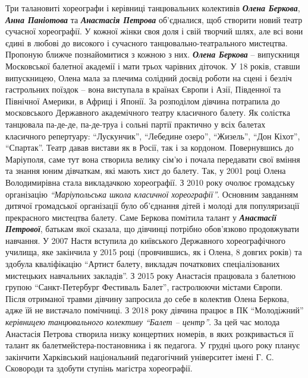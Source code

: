 Три талановиті хореографи і керівниці танцювальних колективів \emph{\textbf{Олена Беркова}},
\emph{\textbf{Анна Паніотова}} та \emph{\textbf{Анастасія Петрова}} об'єдналися, щоб створити новий театр
сучасної хореографії. У кожної жінки своя доля і свій творчий шлях, але всі
вони єдині в любові до високого і сучасного танцювально-театрального мистецтва.
Пропоную ближче познайомитися з кожною з них. \emph{\textbf{Олена Беркова}} – випускниця
Московської балетної академії і мати трьох чарівних діточок. У 18 років, ставши
випускницею, Олена мала за плечима солідний досвід роботи на сцені і безліч
гастрольних поїздок – вона виступала в країнах Європи і Азії, Південної та
Північної Америки, в Африці і Японії. За розподілом дівчина потрапила до
московського Державного академічного театру класичного балету. Як солістка
танцювала па-де-де, па-де-труа і сольні партії практично у всіх балетах
класичного репертуару: \enquote{Лускунчик}, \enquote{Лебедине озеро}, \enquote{Жизель}, \enquote{Дон Кіхот},
\enquote{Спартак}. Театр давав вистави як в Росії, так і за кордоном. Повернувшись до
Маріуполя, саме тут вона створила велику сім'ю і почала передавати свої вміння
та знання юним дівчаткам, які мають хист до балету. Так, у 2001 році Олена
Володимирівна стала викладачкою хореографії. З 2010 року очолює громадську
організацію \emph{\enquote{Маріупольська школа класичної хореографії}}. Основним завданням
дитячої громадської організації було об'єднання дітей і молоді для
популяризації прекрасного мистецтва балету. Саме Беркова помітила талант у
\emph{\textbf{Анастасії Петрової}}, батькам якої сказала, що дівчинці потрібно обов'язково
продовжувати навчання. У 2007 Настя  вступила до київського Державного
хореографічного училища, яке закінчила у 2015 році (провчившись, як і Олена, 8
довгих років) та здобула кваліфікацію \enquote{Артист балету, викладач початкових
спеціалізованих мистецьких навчальних закладів}. З 2015 року Анастасія
працювала з балетною групою \enquote{Санкт-Петербург Фестиваль Балет}, гастролюючи
містами Європи. Після отриманої травми дівчину запросила до себе в колектив
Олена Беркова, адже їй не вистачало помічниці. З 2018 року дівчина працює в ПК
\enquote{Молодіжний} \emph{керівницею танцювального колективу \enquote{Балет – центр}}. За цей час
молода Анастасія Петрова створила низку концертних номерів, в яких
розкривається її талант як балетмейстера-постановника і як педагога. У грудні
цього року планує закінчити Харківський національний педагогічний університет
імені Г. С. Сковороди та  здобути ступінь магістра хореографії.

